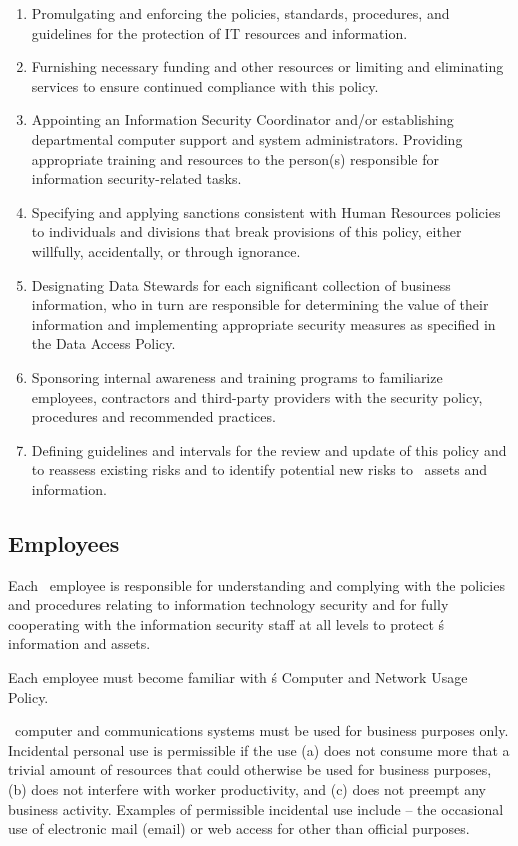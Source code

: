 \documentclass[sec]{policy}
\begin{document}
				\begin{enumerate}[label = \Alph*.]
					\item Promulgating and enforcing the policies, standards, procedures, and guidelines for the protection of IT resources and information.
					\item Furnishing necessary funding and other resources or limiting and eliminating services to ensure continued compliance with this policy. 
					\item Appointing an Information Security Coordinator and/or establishing departmental computer support and system administrators. Providing appropriate training and resources to the person(s) responsible for information security-related tasks.
					\item Specifying and applying sanctions consistent with Human Resources policies to individuals and divisions that break provisions of this policy, either willfully, accidentally, or through ignorance.
					\item Designating Data Stewards for each significant collection of business information, who in turn are responsible for determining the value of their information and implementing appropriate security measures as specified in the Data Access Policy.
					\item Sponsoring internal awareness and training programs to familiarize employees, contractors and third-party providers with the security policy, procedures and recommended practices.
					\item Defining guidelines and intervals for the review and update of this policy and to reassess existing risks and to identify potential new risks to \theOrganization\ assets and information.
				\end{enumerate}
				
			\subsection{Employees}
				
				Each \theOrganization\ employee is responsible for understanding and complying with the policies and procedures relating to information technology security and for fully cooperating with the information security staff at all levels to protect \theOrganization\'s information and assets.
				
				Each employee must become familiar with \theOrganization\'s Computer and Network Usage Policy.
				
				\theOrganization\ computer and communications systems must be used for business purposes only. Incidental personal use is permissible if the use (a) does not consume more that a trivial amount of resources that could otherwise be used for business purposes, (b) does not interfere with worker productivity, and (c) does not preempt any business activity. Examples of permissible incidental use include – the occasional use of electronic mail (email) or web access for other than official purposes.
				
\end{document}
